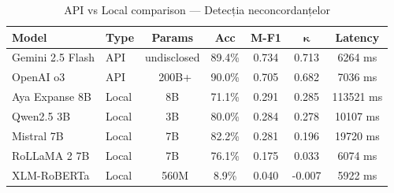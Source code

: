 \begin{table}[H]
\centering
\footnotesize
\caption{API vs Local comparison — Detecția neconcordanțelor}
\label{tab:api-vs-local-incongruity-detection}
\begin{tabular}{llccccc}
\toprule
\textbf{Model} & \textbf{Type} & \textbf{Params} & \textbf{Acc} & \textbf{M-F1} & $\boldsymbol{\kappa}$ & \textbf{Latency} \\
\midrule
Gemini 2.5 Flash & API & undisclosed & 89.4\% & 0.734 & 0.713 & 6264 ms \\
OpenAI o3 & API & ~200B+ & 90.0\% & 0.705 & 0.682 & 7036 ms \\
Aya Expanse 8B & Local & 8B & 71.1\% & 0.291 & 0.285 & 113521 ms \\
Qwen2.5 3B & Local & 3B & 80.0\% & 0.284 & 0.278 & 10107 ms \\
Mistral 7B & Local & 7B & 82.2\% & 0.281 & 0.196 & 19720 ms \\
RoLLaMA 2 7B & Local & 7B & 76.1\% & 0.175 & 0.033 & 6074 ms \\
XLM-RoBERTa & Local & ~560M & 8.9\% & 0.040 & -0.007 & 5922 ms \\
\bottomrule
\end{tabular}
\end{table}